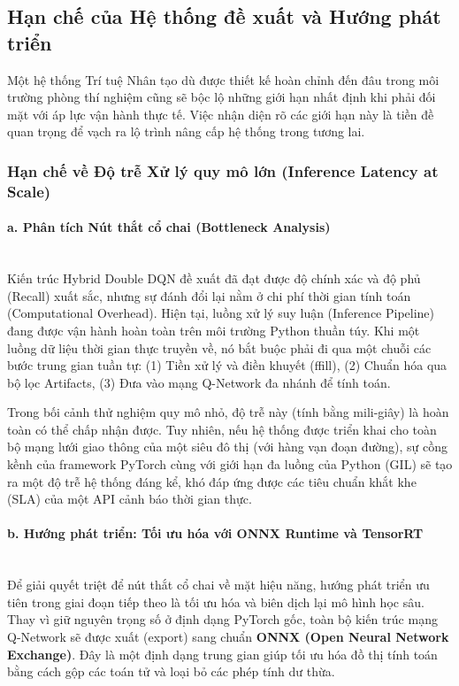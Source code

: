 \subsection{Hạn chế của Hệ thống đề xuất và Hướng phát triển}
\label{sec:5_7}

Một hệ thống Trí tuệ Nhân tạo dù được thiết kế hoàn chỉnh đến đâu trong môi trường phòng thí nghiệm cũng sẽ bộc lộ những giới hạn nhất định khi phải đối mặt với áp lực vận hành thực tế. Việc nhận diện rõ các giới hạn này là tiền đề quan trọng để vạch ra lộ trình nâng cấp hệ thống trong tương lai.

\subsubsection{Hạn chế về Độ trễ Xử lý quy mô lớn (Inference Latency at Scale)}

\paragraph{a. Phân tích Nút thắt cổ chai (Bottleneck Analysis)} \mbox{} \\
Kiến trúc Hybrid Double DQN đề xuất đã đạt được độ chính xác và độ phủ (Recall) xuất sắc, nhưng sự đánh đổi lại nằm ở chi phí thời gian tính toán (Computational Overhead). Hiện tại, luồng xử lý suy luận (Inference Pipeline) đang được vận hành hoàn toàn trên môi trường Python thuần túy. Khi một luồng dữ liệu thời gian thực truyền về, nó bắt buộc phải đi qua một chuỗi các bước trung gian tuần tự: (1) Tiền xử lý và điền khuyết (ffill), (2) Chuẩn hóa qua bộ lọc Artifacts, (3) Đưa vào mạng Q-Network đa nhánh để tính toán.

Trong bối cảnh thử nghiệm quy mô nhỏ, độ trễ này (tính bằng mili-giây) là hoàn toàn có thể chấp nhận được. Tuy nhiên, nếu hệ thống được triển khai cho toàn bộ mạng lưới giao thông của một siêu đô thị (với hàng vạn đoạn đường), sự cồng kềnh của framework PyTorch cùng với giới hạn đa luồng của Python (GIL) sẽ tạo ra một độ trễ hệ thống đáng kể, khó đáp ứng được các tiêu chuẩn khắt khe (SLA) của một API cảnh báo thời gian thực.

\paragraph{b. Hướng phát triển: Tối ưu hóa với ONNX Runtime và TensorRT} \mbox{} \\
Để giải quyết triệt để nút thắt cổ chai về mặt hiệu năng, hướng phát triển ưu tiên trong giai đoạn tiếp theo là tối ưu hóa và biên dịch lại mô hình học sâu. Thay vì giữ nguyên trọng số ở định dạng PyTorch gốc, toàn bộ kiến trúc mạng Q-Network sẽ được xuất (export) sang chuẩn \textbf{ONNX (Open Neural Network Exchange)}. Đây là một định dạng trung gian giúp tối ưu hóa đồ thị tính toán bằng cách gộp các toán tử và loại bỏ các phép tính dư thừa.

